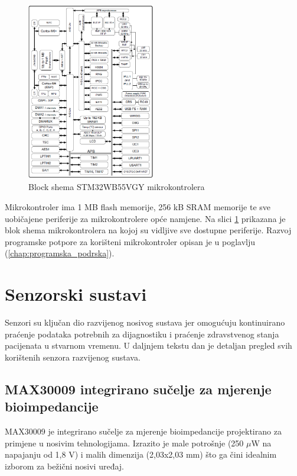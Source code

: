 \documentclass[../diplomski_rad.tex]{subfiles}
\begin{document}
\begin{figure}[htb!]
    \centering
    \includegraphics[width=0.5\textwidth]{Figures/stm32mikro.png} 
    \caption{Block shema STM32WB55VGY mikrokontrolera \cite{stm32mikro}}
    \label{slk:stm32mikro}
\end{figure}

Mikrokontroler ima 1 MB flash memorije, 256 kB SRAM memorije te sve uobičajene periferije za mikrokontrolere opće namjene. 
Na slici \ref{slk:stm32mikro} prikazana je blok shema mikrokontrolera na kojoj su vidljive sve dostupne periferije.
Razvoj programske potpore za korišteni mikrokontroler opisan je u poglavlju (\ref{chap:programska_podrska}).

\section{Senzorski sustavi}

Senzori su ključan dio razvijenog nosivog sustava jer omogućuju kontinuirano praćenje podataka potrebnih 
za dijagnostiku i praćenje zdravstvenog stanja pacijenata u stvarnom vremenu.
U daljnjem tekstu dan je detaljan pregled svih korištenih senzora razvijenog sustava.

\subsection{MAX30009 integrirano sučelje za mjerenje bioimpedancije}

MAX30009 je integrirano sučelje za mjerenje bioimpedancije projektirano za primjene u nosivim tehnologijama. 
Izrazito je male potrošnje (250 $\mu$W na napajanju od 1,8 V) \cite{max30009} i malih dimenzija (2,03x2,03 mm) što ga čini idealnim izborom za bežični nosivi uređaj.  
\end{document}
